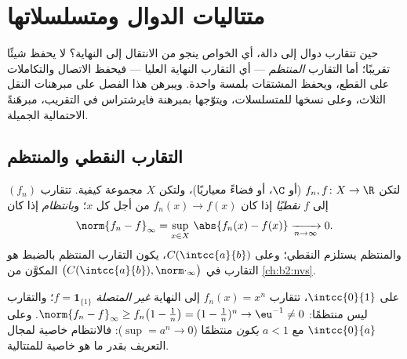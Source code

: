 \chapter{متتاليات الدوال ومتسلسلاتها}\label{ch:b2:funcseq}

حين تتقارب دوال إلى دالة، أي الخواص ينجو من
الانتقال إلى النهاية؟  لا يحفظ شيئًا
تقريبًا؛ أما التقارب \emph{المنتظم} --- أي التقارب  النهاية العليا
--- فيحفظ الاتصال والتكاملات على القطع، ويحفظ المشتقات بلمسة
واحدة. ويبرهن هذا الفصل على مبرهنات النقل الثلاث،
وعلى نسخها للمتسلسلات، ويتوّجها بمبرهنة فايرشتراس
في التقريب، مبرهَنةً  الاحتمالية
الجميلة.

\section{التقارب النقطي والمنتظم}

\begin{definition}\label{def:b2:funcseq:def}
لتكن $f_n, f \colon X \to \R$ (أو $\C$، أو فضاءً معياريًا)، ولتكن $X$ مجموعة
كيفية. تتقارب $(f_n)$ إلى $f$
\emph{نقطيًا} إذا كان $f_n(x) \to
f(x)$ من أجل كل $x$؛ و\emph{بانتظام}
إذا كان
\[
\norm{f_n - f}_\infty = \sup_{x \in X}\, \abs{f_n(x) - f(x)}
\xrightarrow[n \to \infty]{} 0 .
\]
والمنتظم يستلزم النقطي؛ وعلى $C(\intcc{a}{b})$، يكون التقارب المنتظم
بالضبط هو التقارب في 
$\bigl(C(\intcc{a}{b}), \norm\cdot_\infty\bigr)$ المكوَّن من
\cref{ch:b2:nvs}.
\end{definition}

\begin{example}\label{ex:b2:funcseq:xn}
على $\intcc{0}{1}$، تتقارب $f_n(x) = x^n$  إلى النهاية
\emph{غير المتصلة} $f = \mathbf{1}_{\{1\}}$؛ والتقارب
ليس منتظمًا: $\norm{f_n - f}_\infty \geq f_n\bigl(1 -
\tfrac1n\bigr) = (1 - \tfrac1n)^n \to \eu^{-1} \neq 0$. وعلى
$\intcc{0}{a}$ مع $a < 1$ \emph{يكون} منتظمًا ($\sup = a^n \to
0$): فالانتظام خاصية لمجال التعريف بقدر ما هو خاصية
للمتتالية.
\end{example}

